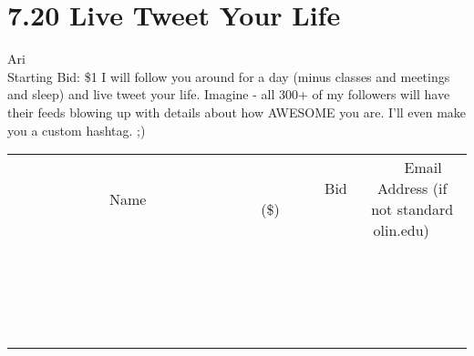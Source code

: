 \documentclass[11pt]{article}
\begin{document}
\section*{7.20 Live Tweet Your Life}
Ari
\\
Starting Bid: \$1
\newline
I will follow you around for a day (minus classes and meetings and sleep) and live tweet your life. Imagine - all 300+ of my followers will have their feeds blowing up with details about how AWESOME you are. I'll even make you a custom hashtag. ;)
\\[3ex]
\begin{tabular}{c c c}
~~~~~~~~~~~~~Name~~~~~~~~~~~~~ & ~~~~~~~~~Bid (\$)~~~~~~~~~  & ~~~Email Address (if not standard olin.edu)~~~\\
 & & \\
\hline
 & & \\
\hline
 & & \\
\hline
 & & \\
\hline
 & & \\
\hline
 & & \\
\hline
 & & \\
\hline
 & & \\
\hline
 & & \\
\hline
 & & \\
\hline
 & & \\
\hline
 & & \\
\hline
 & & \\
\hline
 & & \\
\hline
 & & \\
\hline
 & & \\
\hline
 & & \\
\hline
 & & \\
\hline
 & & \\
\hline
\end{tabular}
\newpage
\end{document}
